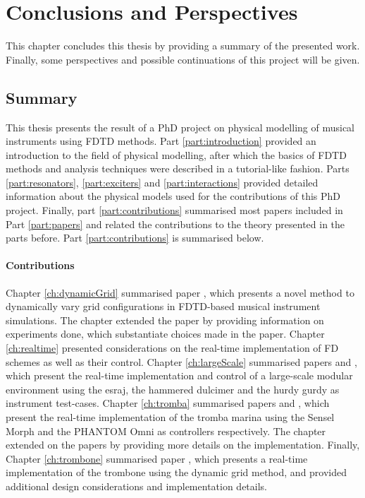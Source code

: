 \chapter{Conclusions and Perspectives}\label{ch:conclusion}
This chapter concludes this thesis by providing a summary of the presented work. Finally, some perspectives and possible continuations of this project will be given.

\section{Summary}
This thesis presents the result of a PhD project on physical modelling of musical instruments using FDTD methods.
Part \ref{part:introduction} provided an introduction to the field of physical modelling, after which the basics of FDTD methods and analysis techniques were described in a tutorial-like fashion. Parts \ref{part:resonators}, \ref{part:exciters} and \ref{part:interactions} provided detailed information about the physical models used for the contributions of this PhD project. Finally, part \ref{part:contributions} summarised most papers included in Part \ref{part:papers} and related the contributions to the theory presented in the parts before. Part \ref{part:contributions} is summarised below.
\subsubsection{Contributions}
Chapter \ref{ch:dynamicGrid} summarised paper \citeP[G], which presents a novel method to dynamically vary grid configurations in FDTD-based musical instrument simulations. The chapter extended the paper by providing information on experiments done, which substantiate choices made in the paper. 
Chapter \ref{ch:realtime} presented considerations on the real-time implementation of FD schemes as well as their control. 
Chapter \ref{ch:largeScale} summarised papers \citeP[A] and \citeP[B], which present the real-time implementation and control of a large-scale modular environment using the esraj, the hammered dulcimer and the hurdy gurdy as instrument test-cases. 
Chapter \ref{ch:tromba} summarised papers \citeP[D] and \citeP[E], which present the real-time implementation of the tromba marina using the Sensel Morph and the PHANTOM Omni as controllers respectively. The chapter extended on the papers by providing more details on the implementation. Finally, Chapter \ref{ch:trombone} summarised paper \citeP[H], which presents a real-time implementation of the trombone using the dynamic grid method, and provided additional design considerations and implementation details.

